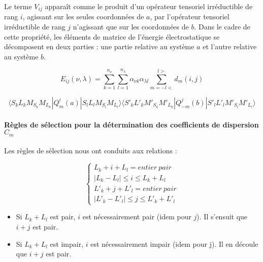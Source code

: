 \documentclass[12pt,a4paper]{book}
\begin{document}
	Le terme $V_{ij}$ apparaît comme le produit d'un opérateur tensoriel irréductible de rang $i$, agissant sur les seules coordonnées de $a$, par l'opérateur tensoriel irréductible de rang $j$ n'agissant que sur les coordonnées de $b$. Dans le cadre de cette propriété, les éléments de matrice de l'énergie électrostatique se décomposent en deux parties : une partie relative au système $a$ et l'autre relative au système $b$. 
	
	\begin{equation*}
	E_{ij}(\nu , \lambda)= \sum_{k=1}^{n_{\nu}} \sum_{l=1}^{n_{\lambda}} \alpha_{\nu k} \alpha_{\lambda l} \sum_{m=-l<}^{l>} d_{m}(i,j)
	\end{equation*}
	
	\begin{equation}
	\langle S_{k}L_{k}M_{S_{k}}M_{L_{k}}| Q_{m}^{i} (a)| S_{l}L_{l}M_{S_{l}}M_{L_{l}}\rangle \langle S'_{k}L'_{k}M'_{S_{k}}M'_{L_{k}}| Q_{-m}^{j} (b) | S'_{l}L'_{l}M'_{S_{l}}M'_{L_{l}}\rangle
	\end{equation}
	
	\paragraph{Règles de sélection pour la détermination des coefficients de dispersion $C_{m}$}
	
	Les règles de sélection nous ont conduits aux relations :
	
	\begin{equation}
	\begin{cases}
	L_{k} + i + L_{l} = entier\ pair \\
	|L_{k} - L_{l}| \leq i \leq L_{k} + L_{l} \\
	L'_{k} + j + L'_{l} = entier\ pair \\
	|L'_{k} - L'_{l}| \leq j \leq L'_{k} + L'_{l}
	\end{cases}
	\end{equation}
	
	\begin{itemize}
		\item Si $L_{k} + L_{l}$ est pair, $i$ est nécessairement pair (idem pour $j$). Il s'ensuit que $i + j$ est pair.	
		\item Si $L_{k} + L_{l}$ est impair, $i$ est nécessairement impair (idem pour j). Il en découle que $i + j$ est pair.
	\end{itemize}
	
\end{document}
